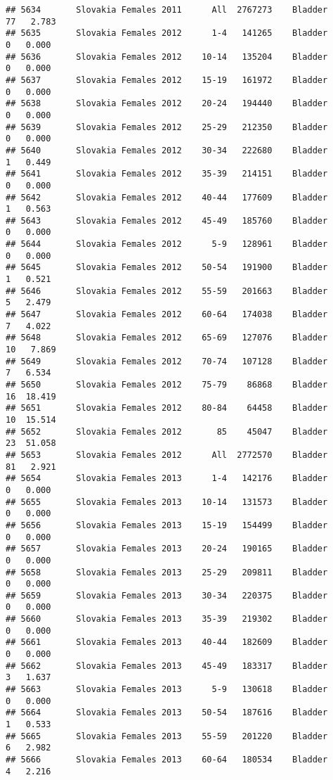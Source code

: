 \documentclass[
]{article}
\begin{document}
\begin{verbatim}
## 5634       Slovakia Females 2011      All  2767273    Bladder     77   2.783
## 5635       Slovakia Females 2012      1-4   141265    Bladder      0   0.000
## 5636       Slovakia Females 2012    10-14   135204    Bladder      0   0.000
## 5637       Slovakia Females 2012    15-19   161972    Bladder      0   0.000
## 5638       Slovakia Females 2012    20-24   194440    Bladder      0   0.000
## 5639       Slovakia Females 2012    25-29   212350    Bladder      0   0.000
## 5640       Slovakia Females 2012    30-34   222680    Bladder      1   0.449
## 5641       Slovakia Females 2012    35-39   214151    Bladder      0   0.000
## 5642       Slovakia Females 2012    40-44   177609    Bladder      1   0.563
## 5643       Slovakia Females 2012    45-49   185760    Bladder      0   0.000
## 5644       Slovakia Females 2012      5-9   128961    Bladder      0   0.000
## 5645       Slovakia Females 2012    50-54   191900    Bladder      1   0.521
## 5646       Slovakia Females 2012    55-59   201663    Bladder      5   2.479
## 5647       Slovakia Females 2012    60-64   174038    Bladder      7   4.022
## 5648       Slovakia Females 2012    65-69   127076    Bladder     10   7.869
## 5649       Slovakia Females 2012    70-74   107128    Bladder      7   6.534
## 5650       Slovakia Females 2012    75-79    86868    Bladder     16  18.419
## 5651       Slovakia Females 2012    80-84    64458    Bladder     10  15.514
## 5652       Slovakia Females 2012       85    45047    Bladder     23  51.058
## 5653       Slovakia Females 2012      All  2772570    Bladder     81   2.921
## 5654       Slovakia Females 2013      1-4   142176    Bladder      0   0.000
## 5655       Slovakia Females 2013    10-14   131573    Bladder      0   0.000
## 5656       Slovakia Females 2013    15-19   154499    Bladder      0   0.000
## 5657       Slovakia Females 2013    20-24   190165    Bladder      0   0.000
## 5658       Slovakia Females 2013    25-29   209811    Bladder      0   0.000
## 5659       Slovakia Females 2013    30-34   220375    Bladder      0   0.000
## 5660       Slovakia Females 2013    35-39   219302    Bladder      0   0.000
## 5661       Slovakia Females 2013    40-44   182609    Bladder      0   0.000
## 5662       Slovakia Females 2013    45-49   183317    Bladder      3   1.637
## 5663       Slovakia Females 2013      5-9   130618    Bladder      0   0.000
## 5664       Slovakia Females 2013    50-54   187616    Bladder      1   0.533
## 5665       Slovakia Females 2013    55-59   201220    Bladder      6   2.982
## 5666       Slovakia Females 2013    60-64   180534    Bladder      4   2.216

\end{verbatim}
\end{document}
